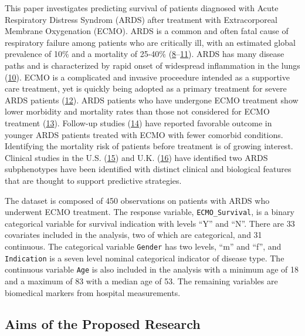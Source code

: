 \documentclass[12pt,]{article}
\begin{document}
This paper investigates predicting survival of patients diagnosed with
Acute Respiratory Distress Syndrom (ARDS) after treatment with
Extracorporeal Membrane Oxygenation (ECMO). ARDS is a common and often
fatal cause of respiratory failure among patients who are critically
ill, with an estimated global prevalence of 10\% and a mortality of
25-40\%
(\protect\hyperlink{ref-bellani_epidemiology_2016}{8}--\protect\hyperlink{ref-paolone_extracorporeal_2017}{11}).
ARDS has many disease paths and is characterized by rapid onset of
widespread inflammation in the lungs
(\protect\hyperlink{ref-fan_acute_2018}{10}). ECMO is a complicated and
invasive proceedure intended as a supportive care treatment, yet is
quickly being adopted as a primary treatment for severe ARDS patients
(\protect\hyperlink{ref-park_extracorporeal_2011}{12}). ARDS patients
who have undergone ECMO treatment show lower morbidity and mortality
rates than those not considered for ECMO treatment
(\protect\hyperlink{ref-wallace_ave_2010}{13}). Follow-up studies
(\protect\hyperlink{ref-sahetya_survival_2018}{14}) have reported
favorable outcome in younger ARDS patients treated with ECMO with fewer
comorbid conditions. Identifying the mortality risk of patients before
treatment is of growing interest. Clinical studies in the U.S.
(\protect\hyperlink{ref-calfee_acute_2018}{15}) and U.K.
(\protect\hyperlink{ref-sinha_latent_2018}{16}) have identified two ARDS
subphenotypes have been identified with distinct clinical and biological
features that are thought to support predictive strategies.

The dataset is composed of 450 observations on patients with ARDS who
underwent ECMO treatment. The response variable,
\texttt{ECMO\_Survival}, is a binary categorical variable for survival
indication with levels ``Y'' and ``N''. There are 33 covariates included
in the analysis, two of which are categorical, and 31 continuous. The
categorical variable \texttt{Gender} has two levels, ``m'' and ``f'',
and \texttt{Indication} is a seven level nominal categorical indicator
of disease type. The continuous variable \texttt{Age} is also included
in the analysis with a minimum age of 18 and a maximum of 83 with a
median age of 53. The remaining variables are biomedical markers from
hospital measurements.

\subsection{Aims of the Proposed
Research}\label{aims-of-the-proposed-research}
\end{document}

